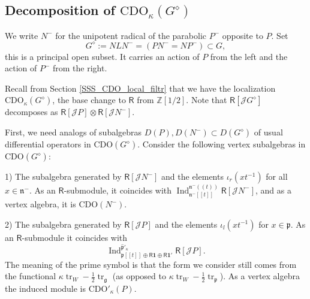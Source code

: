 \documentclass{amsart}
\theoremstyle{definition}
\newcommand{\Ring}{\mathsf{R}}
\newcommand{\g}{\mathfrak{g}}
\newcommand{\Jet}{\mathscr{J}}
\newcommand{\frp}{\mathfrak{p}}
\newcommand{\CDO}{\mathrm{CDO}}
\numberwithin{equation}{section}
\begin{document}

\subsection{Decomposition of $\CDO_\kappa(G^\diamond)$}\label{SS:CDO_decomp}
We write $N^-$ for the unipotent radical of the parabolic $P^-$ opposite to $P$. Set 
\begin{equation}\label{eq:CDO_open_subset}
G^\diamond:=N L N^-=(PN^-=NP^-)\subset G,
\end{equation}
this is a principal open subset. It carries an action of $P$ from the left and the action of $P^-$ from the right.


Recall from Section \ref{SSS_CDO_local_filtr} that we have the localization $\CDO_{\kappa}(G^\diamond)$, the base change to $\Ring$ from $\mathbb{Z}[1/2]$. Note that $\Ring[\Jet G^\diamond] $ decomposes as $\Ring[\Jet P]\otimes \Ring[\Jet N^-]$. 

First, we need analogs of subalgebras $D(P),D(N^-)\subset D(G^\diamond)$ of usual differential operators in $\CDO(G^\diamond)$. Consider the following vertex subalgebras in $\CDO(G^\diamond)$:

1) The subalgebra generated by $\Ring[\Jet N^-]$ and the elements $\iota_r(xt^{-1})$ for all $x\in\mathfrak{n}^-$. As an $\Ring$-submodule, it coincides with $\operatorname{Ind}_{\mathfrak{n^-}[[t]]}^{\mathfrak{n^-}(\!(t)\!)}\Ring[\Jet N^-]$, and as a vertex algebra, it is $\CDO(N^-)$.
 
2) The subalgebra generated by $\Ring[\Jet P]$ and
the elements $\iota_l(xt^{-1})$ for $x\in \mathfrak{p}$. As an $\Ring$-submodule it coincides with
$$\operatorname{Ind}_{\frp[[t]]\oplus \Ring \mathbf{1}\oplus \Ring \mathbf{1}'}^{\hat{\frp}'_{\kappa}}\Ring[\Jet P].$$
The meaning of the prime symbol is that the form we consider still comes from the functional $\kappa\operatorname{tr}_W-\frac{1}{2}\operatorname{tr}_{\g}$ (as opposed to
$\kappa\operatorname{tr}_W-\frac{1}{2}\operatorname{tr}_{\mathfrak{p}}$).
As a vertex algebra the induced module is $\CDO'_{\kappa}(P)$.
\end{document}

